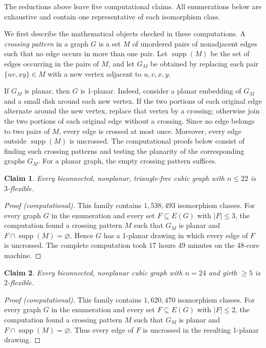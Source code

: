 \documentclass[a4paper,11pt]{article}
\theoremstyle{plain}
\newtheorem{claim}{Claim}
\theoremstyle{definition}  %
\begin{document}
The reductions above leave five computational claims.  All enumerations below
are exhaustive and contain one representative of each isomorphism class.

We first describe the mathematical objects checked in these computations.  A
\emph{crossing pattern} in a graph $G$ is a set $M$ of unordered pairs of
nonadjacent edges such that no edge occurs in more than one pair.  Let
$\operatorname{supp}(M)$ be the set of edges occurring in the pairs of $M$,
and let $G_M$ be obtained by replacing each pair $\{uv,xy\}\in M$ with a new
vertex adjacent to $u,v,x,y$.

If $G_M$ is planar, then $G$ is 1-planar.  Indeed, consider a planar embedding
of $G_M$ and a small disk around each new vertex.  If the two portions of each
original edge alternate around the new vertex, replace that vertex by a
crossing; otherwise join the two portions of each original edge without a
crossing.  Since no edge belongs to two pairs of $M$, every edge is crossed at
most once.  Moreover, every edge outside $\operatorname{supp}(M)$ is
uncrossed.  The computational proofs below consist of finding such crossing
patterns and testing the planarity of the corresponding graphs $G_M$.  For a
planar graph, the empty crossing pattern suffices.

\begin{claim}\label{clm:flexible22}
    Every biconnected, nonplanar, triangle-free cubic graph with
    $n\leq 22$ is $3$-flexible.
\end{claim}

\begin{proof}[Proof (computational)]
    This family contains $1{,}538{,}493$ isomorphism classes.  For every
    graph $G$ in the enumeration and every set
    $F\subseteq E(G)$ with $|F|\leq 3$, the computation found a crossing
    pattern $M$ such that $G_M$ is planar and
    $F\cap\operatorname{supp}(M)=\varnothing$.  Hence $G$ has a 1-planar
    drawing in which every edge of $F$ is uncrossed.  The complete computation
    took 17 hours 49 minutes on the 48-core machine.
\end{proof}

\begin{claim}\label{clm:flexible24}
    Every biconnected, nonplanar cubic graph with $n=24$ and girth $\geq 5$
    is $2$-flexible.
\end{claim}

\begin{proof}[Proof (computational)]
    This family contains $1{,}620{,}470$ isomorphism classes.  For every graph
    $G$ in the enumeration and every set $F\subseteq E(G)$ with $|F|\leq 2$,
    the computation found a crossing pattern $M$ such that $G_M$ is planar and
    $F\cap\operatorname{supp}(M)=\varnothing$.  Thus every edge of $F$ is
    uncrossed in the resulting 1-planar drawing.
\end{proof}
\end{document}
